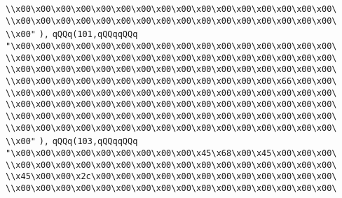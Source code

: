 \verb|\\x00\x00\x00\x00\x00\x00\x00\x00\x00\x00\x00\x00\x00\x00\x00\x00\|\newline
\verb|\\x00\x00\x00\x00\x00\x00\x00\x00\x00\x00\x00\x00\x00\x00\x00\x00\|\newline
\verb|\\x00"|\newline
\verb|),|\newline
\verb|qQQq(101,qQQqqQQq|\newline
\verb|"\x00\x00\x00\x00\x00\x00\x00\x00\x00\x00\x00\x00\x00\x00\x00\x00\|\newline
\verb|\\x00\x00\x00\x00\x00\x00\x00\x00\x00\x00\x00\x00\x00\x00\x00\x00\|\newline
\verb|\\x00\x00\x00\x00\x00\x00\x00\x00\x00\x00\x00\x00\x00\x00\x00\x00\|\newline
\verb|\\x00\x00\x00\x00\x00\x00\x00\x00\x00\x00\x00\x00\x00\x66\x00\x00\|\newline
\verb|\\x00\x00\x00\x00\x00\x00\x00\x00\x00\x00\x00\x00\x00\x00\x00\x00\|\newline
\verb|\\x00\x00\x00\x00\x00\x00\x00\x00\x00\x00\x00\x00\x00\x00\x00\x00\|\newline
\verb|\\x00\x00\x00\x00\x00\x00\x00\x00\x00\x00\x00\x00\x00\x00\x00\x00\|\newline
\verb|\\x00\x00\x00\x00\x00\x00\x00\x00\x00\x00\x00\x00\x00\x00\x00\x00\|\newline
\verb|\\x00"|\newline
\verb|),|\newline
\verb|qQQq(103,qQQqqQQq|\newline
\verb|"\x00\x00\x00\x00\x00\x00\x00\x00\x00\x45\x68\x00\x45\x00\x00\x00\|\newline
\verb|\\x00\x00\x00\x00\x00\x00\x00\x00\x00\x00\x00\x00\x00\x00\x00\x00\|\newline
\verb|\\x45\x00\x00\x2c\x00\x00\x00\x00\x00\x00\x00\x00\x00\x00\x00\x00\|\newline
\verb|\\x00\x00\x00\x00\x00\x00\x00\x00\x00\x00\x00\x00\x00\x00\x00\x00\|\newline
